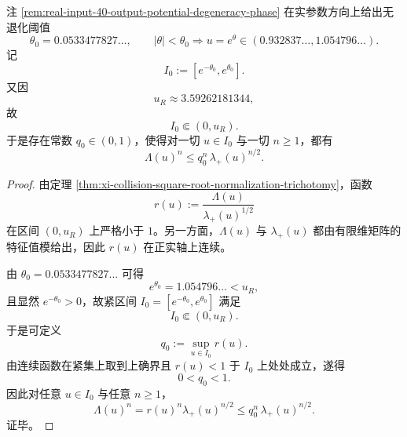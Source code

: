 \begin{corollary}[\texorpdfstring{$u=1$}{u=1} 审计窗口中的统一亚临界性]\label{cor:xi-collision-u1-audit-window-uniform-subcriticality}
注 \ref{rem:real-input-40-output-potential-degeneracy-phase} 在实参数方向上给出无退化阈值
\[
\theta_0=0.0533477827\ldots,
\qquad
|\theta|<\theta_0
\Longrightarrow
u=e^\theta\in(0.932837\ldots,1.054796\ldots).
\]
记
\[
I_0:=[e^{-\theta_0},e^{\theta_0}].
\]
又因
\[
u_R\approx 3.59262181344,
\]
故
\[
I_0\Subset (0,u_R).
\]
于是存在常数 \(q_0\in(0,1)\)，使得对一切 \(u\in I_0\) 与一切 \(n\ge 1\)，都有
\[
\Lambda(u)^n\le q_0^n\,\lambda_+(u)^{n/2}.
\]
\end{corollary}
\begin{proof}
由定理 \ref{thm:xi-collision-square-root-normalization-trichotomy}，函数
\[
r(u):=\frac{\Lambda(u)}{\lambda_+(u)^{1/2}}
\]
在区间 \((0,u_R)\) 上严格小于 \(1\)。另一方面，\(\Lambda(u)\) 与 \(\lambda_+(u)\) 都由有限维矩阵的特征值模给出，因此 \(r(u)\) 在正实轴上连续。

由 \(\theta_0=0.0533477827\ldots\) 可得
\[
e^{\theta_0}=1.054796\ldots<u_R,
\]
且显然 \(e^{-\theta_0}>0\)，故紧区间 \(I_0=[e^{-\theta_0},e^{\theta_0}]\) 满足
\[
I_0\Subset (0,u_R).
\]
于是可定义
\[
q_0:=\sup_{u\in I_0}r(u).
\]
由连续函数在紧集上取到上确界且 \(r(u)<1\) 于 \(I_0\) 上处处成立，遂得
\[
0<q_0<1.
\]
因此对任意 \(u\in I_0\) 与任意 \(n\ge 1\)，
\[
\Lambda(u)^n
=
r(u)^n\lambda_+(u)^{n/2}
\le
q_0^n\,\lambda_+(u)^{n/2}.
\]
证毕。
\end{proof}

\endinput
